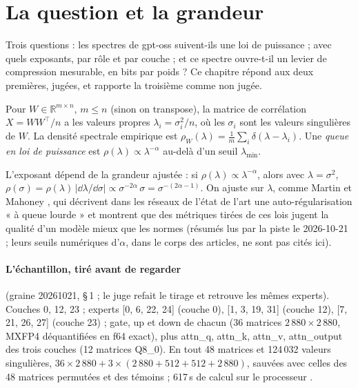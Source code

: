 \section{La question et la grandeur}\label{t3spe:sec:grandeur}

Trois questions : les spectres de gpt-oss suivent-ils une loi de puissance ; avec quels exposants, par rôle et par couche ; et ce spectre ouvre-t-il un levier de compression mesurable, en bits par poids ? Ce chapitre répond aux deux premières, jugées, et rapporte la troisième comme non jugée.

\begin{definition}\label{t3spe:def:esd}
Pour $W \in \mathbb{R}^{m \times n}$, $m \le n$ (sinon on transpose), la matrice de corrélation $X = WW^\top/n$ a les valeurs propres $\lambda_i = \sigma_i^2/n$, où les $\sigma_i$ sont les valeurs singulières de $W$. La densité spectrale empirique est $\rho_W(\lambda) = \frac1m\sum_i \delta(\lambda - \lambda_i)$. Une \emph{queue en loi de puissance} est $\rho(\lambda) \propto \lambda^{-\alpha}$ au-delà d'un seuil $\lambda_{\min}$.
\end{definition}
L'exposant dépend de la grandeur ajustée : si $\rho(\lambda) \propto \lambda^{-\alpha}$, alors avec $\lambda = \sigma^2$, $\rho(\sigma) = \rho(\lambda)\,|\dd\lambda/\dd\sigma| \propto \sigma^{-2\alpha}\,\sigma = \sigma^{-(2\alpha - 1)}$. On ajuste sur $\lambda$, comme Martin et Mahoney \cite{martin2018implicit,martin2021predicting}, qui décrivent dans les réseaux de l'état de l'art une auto-régularisation « à queue lourde » et montrent que des métriques tirées de ces lois jugent la qualité d'un modèle mieux que les normes (résumés lus par la piste le 2026-10-21 ; leurs seuils numériques d'$\alpha$, dans le corps des articles, ne sont pas cités ici).

\paragraph{L'échantillon, tiré avant de regarder} (graine 20261021,  §\,1 ; le juge refait le tirage et retrouve les mêmes experts). Couches 0, 12, 23 ; experts [0, 6, 22, 24] (couche 0), [1, 3, 19, 31] (couche 12), [7, 21, 26, 27] (couche 23) ; gate, up et down de chacun (36 matrices $2\,880 \times 2\,880$, MXFP4 déquantifiées en f64 exact), plus attn\_q, attn\_k, attn\_v, attn\_output des trois couches (12 matrices Q8\_0). En tout 48 matrices et 124\,032 valeurs singulières, $36 \times 2\,880 + 3 \times (2\,880 + 512 + 512 + 2\,880)$, sauvées avec celles des 48 matrices permutées et des témoins ; 617\,s de calcul sur le processeur \mes.

